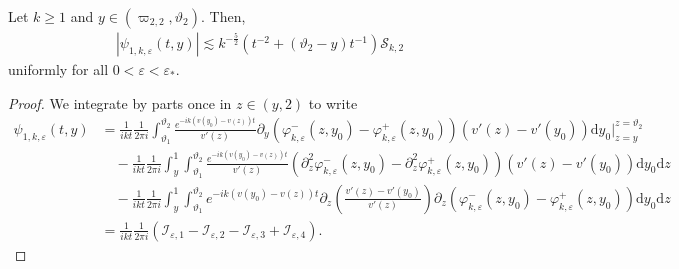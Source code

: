 \documentclass[10pt,a4paper]{amsart}
\newcommand\cI{{\mathcal I}}
\newcommand\cS{{\mathcal S}}
\newcommand{\ep}{\varepsilon}
\renewcommand{\d}{\mathrm{d}}
\begin{document}
\begin{lemma}\label{lemma:firstintegralIDpsiweak}
Let $k\geq 1$ and $y\in (\varpi_{2,2}, \vartheta_2)$. Then,
\begin{align*}
\left| \psi_{1,k,\ep}(t,y) \right| \lesssim k^{-\frac52}\left( t^{-2} + (\vartheta_2-y)t^{-1} \right)\cS_{k,2} 
\end{align*}
uniformly for all $0<\ep<\ep_*$.
\end{lemma}

\begin{proof}
We integrate by parts once in $z\in (y,2)$ to write
\begin{align*}
\psi_{1,k,\ep}(t,y) &= \frac{1}{ikt}\frac{1}{2\pi i}\int_{\vartheta_1}^{\vartheta_2} \frac{e^{-ik(v(y_0)-v(z)) t}}{v'(z)} \partial_y \left( \varphi_{k,\ep}^-(z,y_0) - \varphi_{k,\ep}^+(z,y_0) \right) (v'(z) - v'(y_0) ) \d y_0 \Big|_{z=y}^{z=\vartheta_2} \\
&\quad -\frac{1}{ikt}\frac{1}{2\pi i}\int_y^1 \int_{\vartheta_1}^{\vartheta_2} \frac{e^{-ik(v(y_0)-v(z))t}}{v'(z)} \left( \partial_z^2\varphi_{k,\ep}^-(z,y_0) - \partial_z^2\varphi_{k,\ep}^+(z,y_0) \right) (v'(z) - v'(y_0))\d y_0 \d z \\
&\quad - \frac{1}{ikt}\frac{1}{2\pi i}\int_y^1 \int_{\vartheta_1}^{\vartheta_2} e^{-ik(v(y_0)-v(z))t} \partial_z \left( \frac{v'(z) - v'(y_0)}{v'(z)} \right) \partial_z\left( \varphi_{k,\ep}^-(z,y_0) - \varphi_{k,\ep}^+(z,y_0) \right) \d y_0 \d z \\
&= \frac{1}{ikt}\frac{1}{2\pi i}\left(  \cI_{\ep,1} - \cI_{\ep,2} - \cI_{\ep,3} + \cI_{\ep,4} \right).
\end{align*}


\end{proof}
\end{document}
